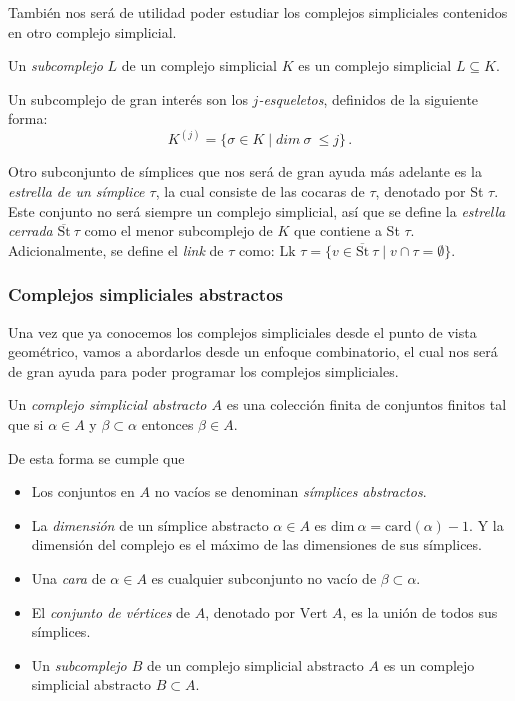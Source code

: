 También nos será de utilidad poder estudiar los complejos simpliciales contenidos en otro complejo simplicial.
\begin{definition}
Un \emph{subcomplejo} $L$ de un complejo simplicial $K$ es un complejo simplicial $L \subseteq K$.
\end{definition}

Un subcomplejo de gran interés son los \emph{$j$-esqueletos}, definidos de la siguiente forma: \[K^{(j)} = \{\sigma \in K \mid dim\ \sigma\ \leq j\}\,.\]

Otro subconjunto de símplices que nos será de gran ayuda más adelante es la \emph{estrella de un símplice $\tau$}, la cual consiste de las cocaras de $\tau$, denotado por St $\tau$. Este conjunto no será siempre un complejo simplicial, así que se define la \emph{estrella cerrada} $\overline{\text{St}}\ \tau$ como el menor subcomplejo de $K$ que contiene a St $\tau$. Adicionalmente, se define el \emph{link} de $\tau$ como: $\text{Lk }\tau = \{v \in \overline{\text{St}}\ \tau \mid v \cap \tau = \emptyset\}$.

\subsubsection*{Complejos simpliciales abstractos}
Una vez que ya conocemos los complejos simpliciales desde el punto de vista geométrico, vamos a abordarlos desde un enfoque combinatorio, el cual nos será de gran ayuda para poder programar los complejos simpliciales.

\begin{definition}
Un \emph{complejo simplicial abstracto $A$} es una colección finita de conjuntos finitos tal que si $\alpha \in A$ y $\beta \subset \alpha$ entonces $\beta \in A$.
\end{definition}
De esta forma se cumple que
\begin{itemize}
	\item Los conjuntos en $A$ no vacíos se denominan \emph{símplices abstractos}.
	\item La \emph{dimensión} de un símplice abstracto $\alpha \in A$ es $\text{dim}\ \alpha = \text{card}(\alpha) - 1$. Y la dimensión del complejo es el máximo de las dimensiones de sus símplices.
	\item Una \emph{cara} de $\alpha \in A$ es cualquier subconjunto no vacío de $\beta \subset \alpha$.
	\item El \emph{conjunto de vértices} de $A$, denotado por $\text{Vert } A$, es la unión de todos sus símplices.
	\item Un \emph{subcomplejo $B$} de un complejo simplicial abstracto $A$ es un complejo simplicial abstracto $B \subset A$.
\end{itemize}

